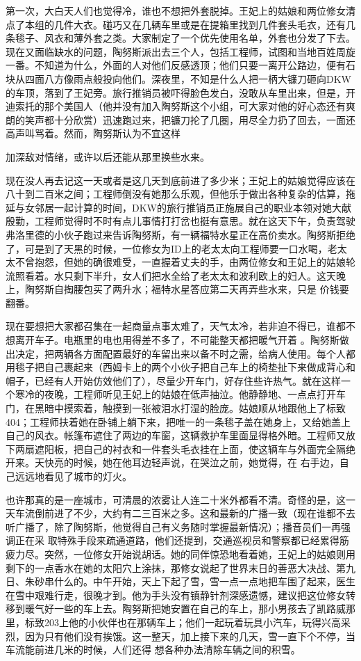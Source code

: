 \documentclass{article}
\begin{document}
第一次，大白天人们也觉得冷，谁也不想把外套脱掉。王妃上的姑娘和两位修女清点了本组的几件大衣。碰巧又在几辆车里或是在提箱里找到几件套头毛衣，还有几条毯子、风衣和薄外套之类。大家制定了一个优先使用名单，外套也分发了下去。现在又面临缺水的问题，陶努斯派出去三个人，包括工程师，试图和当地百姓周旋一番。不知道为什么，外面的人对他们反感透顶；他们只要一离开公路边，便有石块从四面八方像雨点般投向他们。深夜里，不知是什么人把一柄大镰刀砸向DKW的车顶，落到了王妃旁。旅行推销员被吓得脸色发白，没敢从车里出来，但是，开迪索托的那个美国人（他并没有加入陶努斯这个小组，可大家对他的好心态还有爽朗的笑声都十分欣赏）迅速跑过来，把镰刀抡了几圈，用尽全力扔了回去，一面还高声叫骂着。然而，陶努斯认为不宜这样
\newpage

加深敌对情绪，或许以后还能从那里换些水来。 

现在没人再去记这一天或者是这几天到底前进了多少米；王妃上的姑娘觉得应该在八十到二百米之间；工程师倒没有她那么乐观，但他乐于做出各种复杂的估算，拖延与女邻居一起计算的时间，DKW的旅行推销员正施展自己的职业本领对她大献殷勤，工程师觉得时不时有点儿事情打打岔也挺有意思。就在这天下午，负责驾驶弗洛里德的小伙子跑过来告诉陶努斯，有一辆福特水星正在高价卖水。陶努斯拒绝了，可是到了天黑的时候，一位修女为ID上的老太太向工程师要一口水喝，老太太不曾抱怨，但她的确很难受，一直握着丈夫的手，由两位修女和王妃上的姑娘轮流照看着。水只剩下半升，女人们把水全给了老太太和波利欧上的妇人。这天晚上，陶努斯自掏腰包买了两升水；福特水星答应第二天再弄些水来，只是
价钱要翻番。 

现在要想把大家都召集在一起商量点事太难了，天气太冷，若非迫不得已，谁都不想离开车子。电瓶里的电也用得差不多了，不可能整天都把暖气开着
\newpage
。陶努斯做出决定，把两辆各方面配置最好的车留出来以备不时之需，给病人使用。每个人都用毯子把自己裹起来（西姆卡上的两个小伙子把自己车上的椅垫扯下来做成背心和帽子，已经有人开始仿效他们了），尽量少开车门，好存住些许热气。就在这样一个寒冷的夜晚，工程师听见王妃上的姑娘在低声抽泣。他静静地、一点点打开车门，在黑暗中摸索着，触摸到一张被泪水打湿的脸庞。姑娘顺从地跟他上了标致404；工程师扶着她在卧铺上躺下来，把唯一的一条毯子盖在她身上，又给她盖上自己的风衣。帐篷布遮住了两边的车窗，这辆救护车里面显得格外暗。工程师又放下两扇遮阳板，把自己的衬衣和一件套头毛衣挂在上面，使这辆车与外面完全隔绝开来。天快亮的时候，她在他耳边轻声说，在哭泣之前，她觉得，在
右手边，自己远远地看见了城市的灯火。 

也许那真的是一座城市，可清晨的浓雾让人连二十米外都看不清。奇怪的是，这一天车流倒前进了不少，大约有二三百米之多。这和最新的广播一致（现在谁都不去听广播了，除了陶努斯，他觉得自己有义务随时掌握最新情况）；播音员们一再强调正在采
\newpage
取特殊手段来疏通道路，他们还提到，交通巡视员和警察都已经累得筋疲力尽。突然，一位修女开始说胡话。她的同伴惊恐地看着她，王妃上的姑娘则用剩下的一点香水在她的太阳穴上涂抹，那修女说起了世界末日的善恶大决战、第九日、朱砂串什么的。中午开始，天上下起了雪，雪一点一点地把车围了起来，医生在雪中艰难行走，很晚才到。他为手头没有镇静针剂深感遗憾，建议把这位修女转移到暖气好一些的车上去。陶努斯把她安置在自己的车上，那小男孩去了凯路威那里，标致203上他的小伙伴也在那辆车上；他们一起玩着玩具小汽车，玩得兴高采烈，因为只有他们没有挨饿。这一整天，加上接下来的几天，雪一直下个不停，当车流能前进几米的时候，人们还得
想各种办法清除车辆之间的积雪。 
\end{document}
